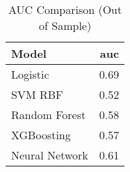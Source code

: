 \begin{table}
\caption{AUC Comparison (Out of Sample)}
\label{tab:auc_oos_compare}
\begin{tabular}{lr}
\toprule
Model & auc \\
\midrule
Logistic & 0.69 \\
SVM RBF & 0.52 \\
Random Forest & 0.58 \\
XGBoosting & 0.57 \\
Neural Network & 0.61 \\
\bottomrule
\end{tabular}
\end{table}
